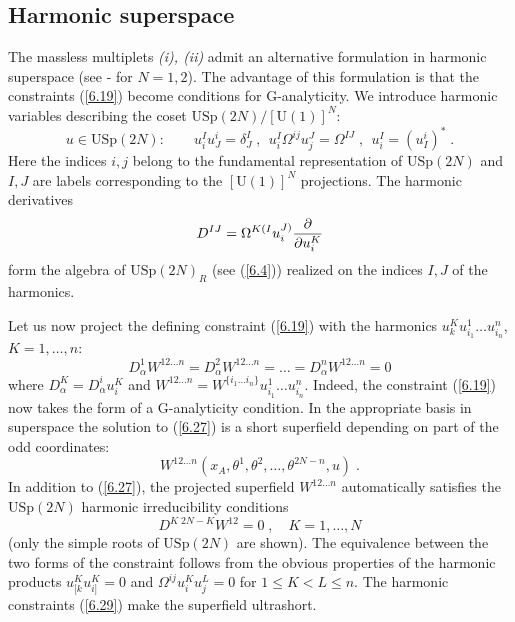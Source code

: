 \documentclass[a4paper,12pt]{article}
\begin{document}
 

\subsection{Harmonic superspace}

The massless multiplets {\sl (i), (ii)} admit an alternative 
formulation in harmonic superspace (see \cite{HStT}-\cite{Howe} 
for $N=1,2$). The advantage of this formulation is that the 
constraints (\ref{6.19}) become conditions for G-analyticity. We 
introduce harmonic variables describing the coset 
$\mbox{USp}(2N)/[\mbox{U}(1)]^N$: 
\begin{equation}\label{6.25}
  u\in \mbox{USp}(2N): \qquad u^I_iu^i_J = \delta^I_J\;, 
\ \ u^I_i \Omega^{ij}u^J_j = \Omega^{IJ}\;, \ \  u^I_i= 
(u^i_I)^*\;. 
\end{equation}
Here the indices $i,j$ belong to the fundamental representation of  
$\mbox{USp}(2N)$ and $I,J$ are labels corresponding to the 
$[\mbox{U}(1)]^N$ projections. The harmonic derivatives  
\begin{equation}\label{6.26}
  D^{IJ} = \Omega^{K(I}u^{J)}_i{\partial\over\partial u^K_i}
\end{equation}
form the algebra of $\mbox{USp}(2N)_R$ (see (\ref{6.4})) realized 
on the indices $I,J$ of the harmonics. 

Let us now project the defining constraint (\ref{6.19}) with the 
harmonics $u^K_k u^1_{i_1}\ldots u^n_{i_n}$, $K=1,\ldots,n$: 
\begin{equation}\label{6.27}
D^1_\alpha W^{12\ldots n} = D^2_\alpha W^{12\ldots n}= \ldots =  
D^n_\alpha W^{12\ldots n} =0 
\end{equation}
where $D^{K}_\alpha = D^i_\alpha u^{K}_i$ and $W^{12\ldots 
n}=W^{\{i_1\ldots i_n\}}u^1_{i_1}\ldots u^n_{i_n}$. Indeed, the 
constraint (\ref{6.19}) now takes the form of a G-analyticity 
condition. In the appropriate basis in superspace the solution to 
(\ref{6.27}) is a short superfield depending on part of the odd 
coordinates: 
\begin{equation}\label{6.28}
W^{12\ldots n}(x_A,\theta^1,\theta^2,\ldots, \theta^{2N-n},u)\;. 
\end{equation}
In addition to (\ref{6.27}), the projected superfield $W^{12\ldots 
n}$ automatically satisfies the $\mbox{USp}(2N)$ harmonic 
irreducibility conditions 
\begin{equation}\label{6.29}
   D^{K\; 2N-K}W^{12} = 0\;, \quad K=1,\ldots,N
\end{equation}
(only the simple roots of $\mbox{USp}(2N)$ are shown). The 
equivalence between the two forms of the constraint follows from 
the obvious properties of the harmonic products $u^K_{[k} u^K_{i]} 
=0$ and $\Omega^{ij}u^K_iu^L_j=0$ for $1\leq K < L\leq n$. The 
harmonic constraints (\ref{6.29}) make the superfield ultrashort. 
\end{document}
